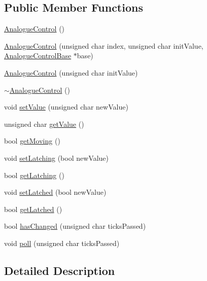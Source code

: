 \subsection*{Public Member Functions}
\begin{DoxyCompactItemize}
\item 
\hyperlink{class_analogue_control_aad4d11c644df1b2b31e32333aceb5d1a}{Analogue\+Control} ()
\item 
\hyperlink{class_analogue_control_a58826c0582ce0697d1c03a92991a648c}{Analogue\+Control} (unsigned char index, unsigned char init\+Value, \hyperlink{class_analogue_control_base}{Analogue\+Control\+Base} $\ast$base)
\item 
\hyperlink{class_analogue_control_af5c00f8da0a5b050a6552e4d111bfe39}{Analogue\+Control} (unsigned char init\+Value)
\item 
\hyperlink{class_analogue_control_a08a12843e8a0a1cb8a0ef9da3865a453}{$\sim$\+Analogue\+Control} ()
\item 
void \hyperlink{class_analogue_control_a160ce73eb8eebdf131dca4dcebc44a42}{set\+Value} (unsigned char new\+Value)
\item 
unsigned char \hyperlink{class_analogue_control_ad92cad38f19cedae45aeeab748ddb455}{get\+Value} ()
\item 
bool \hyperlink{class_analogue_control_a1c2b0439a77656ce62ddc69ee851cb86}{get\+Moving} ()
\item 
void \hyperlink{class_analogue_control_af9129cb76c8fb8ea46e5fea1ea00be73}{set\+Latching} (bool new\+Value)
\item 
bool \hyperlink{class_analogue_control_a69b90c306b7831a3addb30b6683ec171}{get\+Latching} ()
\item 
void \hyperlink{class_analogue_control_a3dd85b57a3fe8eceddcd2e4bbfce1ea9}{set\+Latched} (bool new\+Value)
\item 
bool \hyperlink{class_analogue_control_a0fd8ee45aa916be0b7ba0bdccab41033}{get\+Latched} ()
\item 
bool \hyperlink{class_analogue_control_ab670265f948d7416bcf07c91dcf97bce}{has\+Changed} (unsigned char ticks\+Passed)
\item 
void \hyperlink{class_analogue_control_a5ec0b55a6abd8c73e61f86f2322251a5}{poll} (unsigned char ticks\+Passed)
\end{DoxyCompactItemize}


\subsection{Detailed Description}


